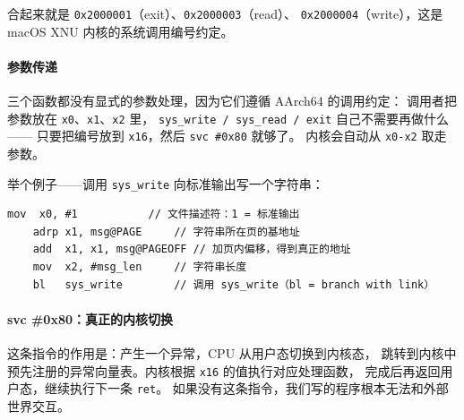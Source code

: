 合起来就是 \texttt{0x2000001}（exit）、\texttt{0x2000003}（read）、
\texttt{0x2000004}（write），这是 macOS XNU 内核的系统调用编号约定。

\paragraph{参数传递}
三个函数都没有显式的参数处理，因为它们遵循 AArch64 的调用约定：
调用者把参数放在 \texttt{x0}、\texttt{x1}、\texttt{x2} 里，
\texttt{sys\_write / sys\_read / exit} 自己不需要再做什么——
只要把编号放到 \texttt{x16}，然后 \texttt{svc \#0x80} 就够了。
内核会自动从 \texttt{x0-x2} 取走参数。

举个例子——调用 \texttt{sys\_write} 向标准输出写一个字符串：

\begin{lstlisting}[style=asm,caption=sys\_write 的典型调用]
    mov  x0, #1           // 文件描述符：1 = 标准输出
    adrp x1, msg@PAGE     // 字符串所在页的基地址
    add  x1, x1, msg@PAGEOFF // 加页内偏移，得到真正的地址
    mov  x2, #msg_len     // 字符串长度
    bl   sys_write        // 调用 sys_write（bl = branch with link）
\end{lstlisting}

\paragraph{svc \#0x80：真正的内核切换}
这条指令的作用是：产生一个异常，CPU 从用户态切换到内核态，
跳转到内核中预先注册的异常向量表。内核根据 \texttt{x16} 的值执行对应处理函数，
完成后再返回用户态，继续执行下一条 \texttt{ret}。
如果没有这条指令，我们写的程序根本无法和外部世界交互。
